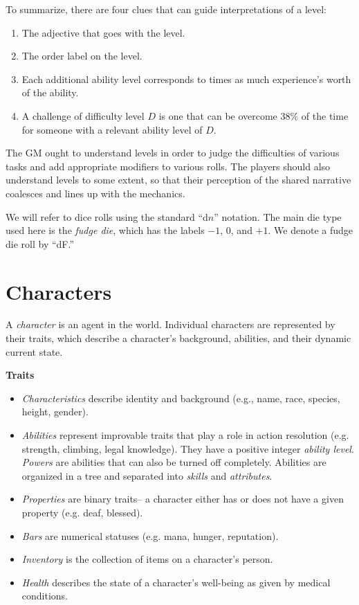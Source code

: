 \documentclass[12pt]{article}
\newcommand{\emdex}[1]{\emph{#1}\index{#1}}
\begin{document}
To summarize, there are four clues that can guide interpretations of a level:
\vspace{-1em}\begin{enumerate}
\item The adjective that goes with the level.
\item The order label on the level.
\item Each additional ability level corresponds to
 times as much experience's worth of the ability.
\item A challenge of difficulty level $D$ is one that can be overcome $38\%$ of the time for
someone with a relevant ability level of $D$.
\end{enumerate}
The GM ought to understand levels in order to judge the difficulties of various tasks
and add appropriate modifiers to various rolls.
The players should also understand levels to some extent,
so that their perception of the shared narrative coalesces and lines up with the mechanics.

We will refer to dice rolls using the standard ``d$n$'' notation.
The main die type used here is the \emdex{fudge die},
which has the labels $-1$, $0$, and $+1$.
We denote a fudge die roll by ``dF.''


\section{Characters}
A \emph{character}
 is an agent in the world.
Individual characters are represented by their traits,
which describe a character's background, abilities, and their dynamic current state.

\textbf{Traits}\vspace{-1em}
\begin{itemize}
\item \emph{Characteristics}
describe identity and background
(e.g., name, race, species, height, gender).
\item \emph{Abilities}
represent improvable traits that play a role in action resolution
(e.g. strength, climbing, legal knowledge).
They have a positive integer \emph{ability level}.
\emph{Powers} are abilities that can also be turned off completely.
Abilities are organized in a tree and separated into \emph{skills} and \emph{attributes}.
\item \emph{Properties} are binary traits-- a character either has or does not have a given property
(e.g. deaf, blessed).
\item \emph{Bars} are numerical statuses (e.g. mana, hunger, reputation).
\item \emph{Inventory} is the collection of items on a character's person.
\item \emph{Health} describes the state of a character's well-being as given by medical conditions.
\end{itemize}
\end{document}
